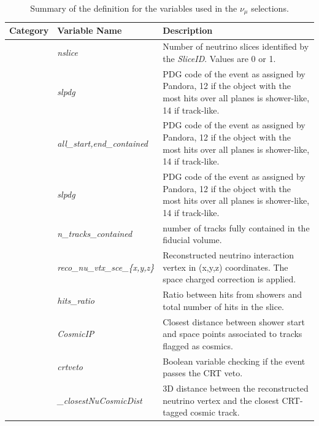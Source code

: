 \begin{table}[ht]
\caption{\label{tab:numuvariableSummary} Summary of the definition for the variables used in the $\nu_{\mu}$ selections.}
\centering
\begin{tabular}{ m{} | m{} | m{}  }
Category & Variable Name & Description  \\
\hline

\multicolumn{1}{l|}{} & \emph{nslice} &  Number of neutrino slices identified by the \emph{SliceID}. Values are  0 or 1.\\  \cline{2-3}
\multicolumn{1}{l|}{} & \emph{slpdg} &  PDG code of the event as assigned by Pandora, 12 if the object with the most hits over all planes is shower-like, 14 if track-like.\\  \cline{2-3}
\multicolumn{1}{l|}{} & \emph{all\_{start,end}\_contained} &  PDG code of the event as assigned by Pandora, 12 if the object with the most hits over all planes is shower-like, 14 if track-like.\\  \cline{2-3}
\multicolumn{1}{l|}{} & \emph{slpdg} &  PDG code of the event as assigned by Pandora, 12 if the object with the most hits over all planes is shower-like, 14 if track-like.\\  \cline{2-3}
\multicolumn{1}{l|}{} & \emph{n\_tracks\_contained} &  number of tracks fully contained in the fiducial volume.\\  \cline{2-3}
\multicolumn{1}{l|}{} & \emph{reco\_nu\_vtx\_sce\_\{x,y,z\}} & Reconstructed neutrino interaction vertex in (x,y,z) coordinates. The space charged correction is applied.  \\  \cline{2-3}
\parbox[t]{2mm}{} & \emph{hits\_ratio} & Ratio between hits from showers and total number of hits in the slice. \\  
 & \emph{CosmicIP} & Closest distance between shower start and space points associated to tracks flagged as cosmics. \\  
 & \emph{crtveto} & Boolean variable checking if the event passes the CRT veto. \\  
 & \emph{\_closestNuCosmicDist} &  3D distance between the reconstructed neutrino vertex and the closest CRT-tagged cosmic track. \\  
\hline



\end{tabular}
\end{table}
